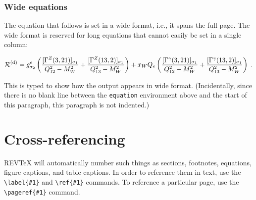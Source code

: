 \documentclass[%
 reprint,
 amsmath,amssymb,
 aps,
]{revtex4-1}
\begin{document}
\subsubsection{Wide equations}
The equation that follows is set in a wide format, i.e., it spans the full page. 
The wide format is reserved for long equations
that cannot easily be set in a single column:
\begin{widetext}
\begin{equation}
{\cal R}^{(\text{d})}=
 g_{\sigma_2}^e
 \left(
   \frac{[\Gamma^Z(3,21)]_{\sigma_1}}{Q_{12}^2-M_W^2}
  +\frac{[\Gamma^Z(13,2)]_{\sigma_1}}{Q_{13}^2-M_W^2}
 \right)
 + x_WQ_e
 \left(
   \frac{[\Gamma^\gamma(3,21)]_{\sigma_1}}{Q_{12}^2-M_W^2}
  +\frac{[\Gamma^\gamma(13,2)]_{\sigma_1}}{Q_{13}^2-M_W^2}
 \right)\;. 
 \label{eq:wideeq}
\end{equation}
\end{widetext}
This is typed to show how the output appears in wide format.
(Incidentally, since there is no blank line between the \texttt{equation} environment above 
and the start of this paragraph, this paragraph is not indented.)

\section{Cross-referencing}
REV\TeX{} will automatically number such things as
sections, footnotes, equations, figure captions, and table captions. 
In order to reference them in text, use the
\verb+\label{#1}+ and \verb+\ref{#1}+ commands. 
To reference a particular page, use the \verb+\pageref{#1}+ command.
\end{document}
